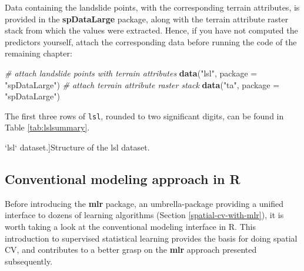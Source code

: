 \documentclass[]{krantz}
\newenvironment{Shaded}{\begin{snugshade}}{\end{snugshade}}
\newcommand{\CommentTok}[1]{\textcolor[rgb]{0.37,0.37,0.37}{\textit{#1}}}
\newcommand{\DataTypeTok}[1]{\textcolor[rgb]{0.27,0.27,0.27}{#1}}
\newcommand{\KeywordTok}[1]{\textcolor[rgb]{0.27,0.27,0.27}{\textbf{#1}}}
\newcommand{\NormalTok}[1]{#1}
\newcommand{\StringTok}[1]{\textcolor[rgb]{0.5,0.5,0.5}{#1}}
\begin{document}
Data containing the landslide points, with the corresponding terrain attributes, is provided in the \textbf{spDataLarge} package, along with the terrain attribute raster stack from which the values were extracted.
Hence, if you have not computed the predictors yourself, attach the corresponding data before running the code of the remaining chapter:

\begin{Shaded}
\begin{Highlighting}[]
\CommentTok{# attach landslide points with terrain attributes}
\KeywordTok{data}\NormalTok{(}\StringTok{"lsl"}\NormalTok{, }\DataTypeTok{package =} \StringTok{"spDataLarge"}\NormalTok{)}
\CommentTok{# attach terrain attribute raster stack}
\KeywordTok{data}\NormalTok{(}\StringTok{"ta"}\NormalTok{, }\DataTypeTok{package =} \StringTok{"spDataLarge"}\NormalTok{)}
\end{Highlighting}
\end{Shaded}

The first three rows of \texttt{lsl}, rounded to two significant digits, can be found in Table \ref{tab:lslsummary}.

\begin{table}[t]

\caption[`lsl` dataset.]{\label{tab:lslsummary}Structure of the lsl dataset.}
\centering
{}
\end{table}

\hypertarget{conventional-model}{%
\subsection{Conventional modeling approach in R}\label{conventional-model}}

Before introducing the \textbf{mlr} package, an umbrella-package providing a unified interface to dozens of learning algorithms (Section \ref{spatial-cv-with-mlr}), it is worth taking a look at the conventional modeling interface in R.
This introduction to supervised statistical learning provides the basis for doing spatial CV, and contributes to a better grasp on the \textbf{mlr} approach presented subsequently.
\end{document}
